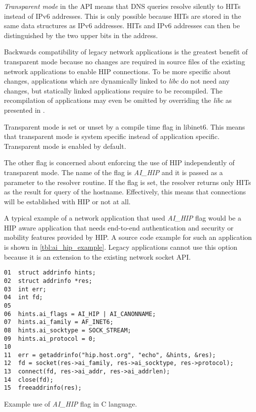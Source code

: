 \textit{Transparent mode} in the API means that DNS queries resolve
silently to HITs instead of IPv6 addresses. This is only possible
because HITs are stored in the same data structures as IPv6
addresses. HITs and IPv6 addresses can then be distinguished by the
two upper bits in the address.

Backwards compatibility of legacy network applications is the greatest
benefit of transparent mode because no changes are required in source
files of the existing network applications to enable HIP
connections. To be more specific about changes, applications which are
dynamically linked to \textit{libc} do not need any changes, but
statically linked applications require to be recompiled. The
recompilation of applications may even be omitted by overriding the
\textit{libc} as presented in \cite{libcoverride}.

Transparent mode is set or unset by a compile time flag in
libinet6. This means that transparent mode is system specific instead
of application specific. Transparent mode is enabled by default.

The other flag is concerned about enforcing the use of HIP
independently of transparent mode. The name of the flag is
\textit{AI\_HIP} and it is passed as a parameter to the resolver
routine. If the flag is set, the resolver returns only HITs as the
result for query of the hostname. Effectively, this means that
connections will be established with HIP or not at all.

A typical example of a network application that used \textit{AI\_HIP}
flag would be a HIP aware application that needs end-to-end
authentication and security or mobility features provided by HIP. A
source code example for such an application is shown in
\autoref{tbl:ai_hip_example}. Legacy applications cannot use this
option because it is an extension to the existing network socket API.

\begin{table}[hbt]
\begin{verbatim}
01  struct addrinfo hints;
02  struct addrinfo *res;
03  int err;
04  int fd;
05
06  hints.ai_flags = AI_HIP | AI_CANONNAME;
07  hints.ai_family = AF_INET6;
08  hints.ai_socktype = SOCK_STREAM;
09  hints.ai_protocol = 0;
10
11  err = getaddrinfo("hip.host.org", "echo", &hints, &res);
12  fd = socket(res->ai_family, res->ai_socktype, res->protocol);
13  connect(fd, res->ai_addr, res->ai_addrlen);
14  close(fd);
15  freeaddrinfo(res);
\end{verbatim}
\caption{Example use of \textit{AI\_HIP} flag in C language.}
\label{tbl:ai_hip_example}
\end{table}


